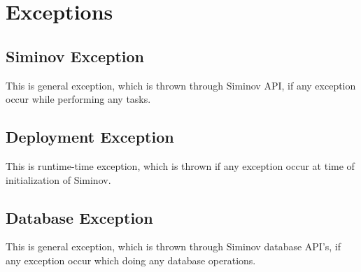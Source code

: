 \newpage
\chapter {\Large{Exceptions}}

\section{Siminov Exception}
	

\par
This is general exception, which is thrown through Siminov API, if any exception occur while performing any tasks.

\section{Deployment Exception}
	

\par
This is runtime-time exception, which is thrown if any exception occur at time of initialization of Siminov.

\section{Database Exception}
	

\par
This is general exception, which is thrown through Siminov database API's, if any exception occur which doing any database operations.
